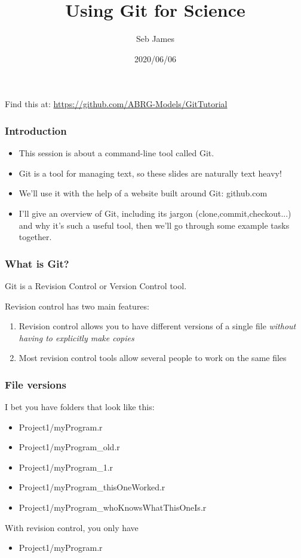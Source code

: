 \documentclass{beamer}
\title{Using Git for Science}
\author{Seb James}
\institute{PSY6422}
\date{2020/06/06}
\begin{document}
\begin{frame}
  \titlepage %
  Find this at: \url{https://github.com/ABRG-Models/GitTutorial}
\end{frame}

\begin{frame}
  \frametitle{Introduction}
  \begin{itemize}
    \item This session is about a command-line tool called Git.

    \item Git is a tool for managing text, so these slides are naturally text
      heavy!

    \item We'll use it with the help of a website built around Git: github.com

    \item I'll give an overview of Git, including its jargon
      (\alert{clone},\alert{commit},\alert{checkout}...) and why it's
      such a useful tool, then we'll go through some example tasks together.
  \end{itemize}
\end{frame}

\begin{frame}
  \frametitle{What is Git?}
  Git is a \alert{Revision Control} or \alert{Version Control} tool.

  Revision control has two main features:

  \begin{enumerate}
    \pause \item Revision control allows you to have different versions of a
      single file \emph{without having to explicitly make copies}
      \pause \item Most revision control tools allow several people to work
      on the same files %
  \end{enumerate}
\end{frame}

\begin{frame}
  \frametitle{File versions}
  I bet you have folders that look like this:
  \pause \begin{itemize}
  \item Project1/myProgram.r
    \pause \item Project1/myProgram\_old.r
  \item Project1/myProgram\_1.r
  \item Project1/myProgram\_thisOneWorked.r
  \item Project1/myProgram\_whoKnowsWhatThisOneIs.r
  \end{itemize}
  \pause With revision control, you only have
  \begin{itemize}
  \item Project1/myProgram.r
  \end{itemize}
\end{frame}
\end{document}
